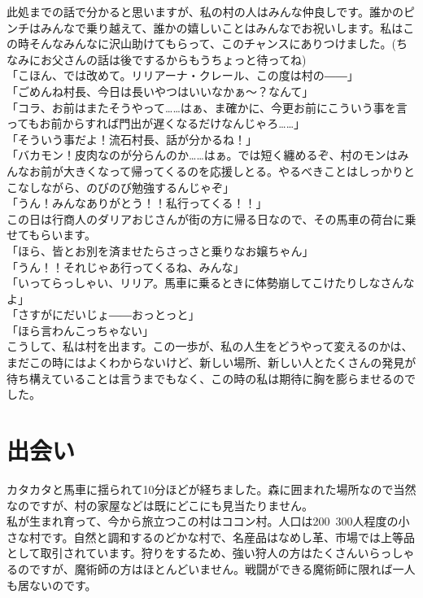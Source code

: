 \documentclass[oneside, a4paper]{jsbook}
\begin{document}
此処までの話で分かると思いますが、私の村の人はみんな仲良しです。誰かのピンチはみんなで乗り越えて、誰かの嬉しいことはみんなでお祝いします。私はこの時そんなみんなに沢山助けてもらって、このチャンスにありつけました。(ちなみにお父さんの話は後でするからもうちょっと待ってね)\\

\noindent
「こほん、では改めて。リリアーナ・クレール、この度は村の――」\\
「ごめんね村長、今日は長いやつはいいなかぁ～？なんて」\\
「コラ、お前はまたそうやって……はぁ、ま確かに、今更お前にこういう事を言ってもお前からすれば門出が遅くなるだけなんじゃろ……」\\
「そういう事だよ！流石村長、話が分かるね！」\\
「バカモン！皮肉なのが分らんのか……はぁ。では短く纏めるぞ、村のモンはみんなお前が大きくなって帰ってくるのを応援しとる。やるべきことはしっかりとこなしながら、のびのび勉強するんじゃぞ」\\
「うん！みんなありがとう！！私行ってくる！！」\\

この日は行商人のダリアおじさんが街の方に帰る日なので、その馬車の荷台に乗せてもらいます。\\

\noindent
「ほら、皆とお別を済ませたらさっさと乗りなお嬢ちゃん」\\
「うん！！それじゃあ行ってくるね、みんな」\\
「いってらっしゃい、リリア。馬車に乗るときに体勢崩してこけたりしなさんなよ」\\
「さすがにだいじょ――おっとっと」\\
「ほら言わんこっちゃない」\\

こうして、私は村を出ます。この一歩が、私の人生をどうやって変えるのかは、まだこの時にはよくわからないけど、新しい場所、新しい人とたくさんの発見が待ち構えていることは言うまでもなく、この時の私は期待に胸を膨らませるのでした。

\newpage

\section{出会い}

カタカタと馬車に揺られて10分ほどが経ちました。森に囲まれた場所なので当然なのですが、村の家屋などは既にどこにも見当たりません。\\

私が生まれ育って、今から旅立つこの村はココン村。人口は200~300人程度の小さな村です。自然と調和するのどかな村で、名産品はなめし革、市場では上等品として取引されています。狩りをするため、強い狩人の方はたくさんいらっしゃるのですが、魔術師の方はほとんどいません。戦闘ができる魔術師に限れば一人も居ないのです。\\
\end{document}
